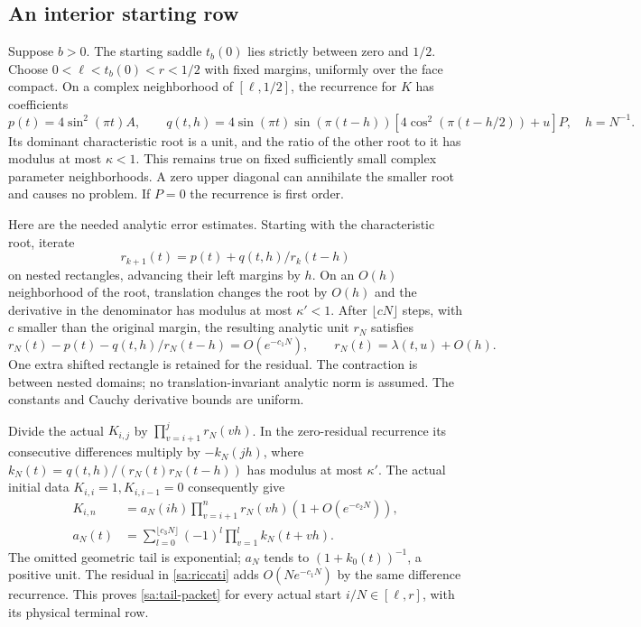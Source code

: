\subsection{An interior starting row}
Suppose $b>0$. The starting saddle $t_b(0)$ lies strictly between
zero and $1/2$. Choose $0<\ell<t_b(0)<r<1/2$ with fixed margins,
uniformly over the face compact. On a complex neighborhood of
$[\ell,1/2]$, the recurrence for $K$ has coefficients
\[
 p(t)=4\sin^2(\pi t)A,\qquad
 q(t,h)=4\sin(\pi t)\sin(\pi(t-h))
                      [4\cos^2(\pi(t-h/2))+u]P,
                         \quad h=N^{-1}.
\]
Its dominant characteristic root is a unit, and the ratio of the
other root to it has modulus at most $\kappa<1$. This remains true
on fixed sufficiently small complex parameter neighborhoods. A zero
upper diagonal can annihilate the smaller root and causes no problem.
If $P=0$ the recurrence is first order.

Here are the needed analytic error estimates. Starting with the
characteristic root, iterate
\[
 r_{k+1}(t)=p(t)+q(t,h)/r_k(t-h)
\]
on nested rectangles, advancing their left margins by $h$. On an
$O(h)$ neighborhood of the root, translation changes the root by
$O(h)$ and the derivative in the denominator has modulus at most
$\kappa'<1$. After $\lfloor cN\rfloor$ steps, with $c$ smaller than
the original margin, the resulting analytic unit $r_N$ satisfies
\begin{equation}\label{sa:riccati}
 r_N(t)-p(t)-q(t,h)/r_N(t-h)=O(e^{-c_1N}),\qquad
                         r_N(t)=\lambda(t,u)+O(h).
\end{equation}
One extra shifted rectangle is retained for the residual. The contraction
is between nested domains; no translation-invariant analytic norm is
assumed. The constants and Cauchy derivative bounds are uniform.

Divide the actual $K_{i,j}$ by $\prod_{v=i+1}^j r_N(vh)$. In the
zero-residual recurrence its consecutive differences multiply by
$-k_N(jh)$, where
$k_N(t)=q(t,h)/(r_N(t)r_N(t-h))$ has modulus at most $\kappa'$.
The actual initial data $K_{i,i}=1,K_{i,i-1}=0$ consequently give
\begin{align}
 K_{i,n}&=a_N(ih)\prod_{v=i+1}^n r_N(vh)(1+O(e^{-c_2N})),
                                                       \label{sa:tail-packet}\\
 a_N(t)&=\sum_{l=0}^{\lfloor c_3N\rfloor}
                  (-1)^l\prod_{v=1}^l k_N(t+vh).
\end{align}
The omitted geometric tail is exponential; $a_N$ tends to
$(1+k_0(t))^{-1}$, a positive unit. The residual in
\eqref{sa:riccati} adds $O(Ne^{-c_1N})$ by the same difference
recurrence. This proves \eqref{sa:tail-packet} for every actual start
$i/N\in[\ell,r]$, with its physical terminal row.


